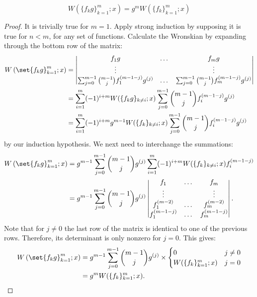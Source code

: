 \documentclass{article}
\begin{document}
\begin{lemma}
\begin{equation*}
W(\{ f_k g \}_{k=1}^m ; x) = g^m W(\{ f_k \}_{k=1}^m ; x )
\end{equation*}
\label{lem:group}
\end{lemma}

\begin{proof}
It is trivially true for $m=1$.
Apply strong induction by supposing it is true for $n<m$, for any set of functions.
Calculate the Wronskian by expanding through the bottom row of the matrix:
\begin{equation*}
\begin{split}
\W{\set{f_k g}_{k=1}^m}{x}
& = \begin{vmatrix}
f_1 g & \dots & f_m g \\
\vdots & & \vdots \\
\sum_{j=0}^{m-1} \binom{m-1}{j} f_1^{(m-1-j)} g^{(j)}
& \dots & \sum_{j=0}^{m-1} \binom{m-1}{j} f_m^{(m-1-j)} g^{(j)}
\end{vmatrix} \\
& = \sum_{i=1}^m (-1)^{i+m} W(\{f_k g\}_{k \neq i} ; x) \sum_{j=0}^{m-1} \binom{m-1}{j} f_i^{(m-1-j)} g^{(j)} \\
& = \sum_{i=1}^m (-1)^{i+m} g^{m-1} W(\{ f_k \}_{k \neq i} ; x) \sum_{j=0}^{m-1} \binom{m-1}{j} f_i^{(m-1-j)} g^{(j)}
\end{split}
\end{equation*}
by our induction hypothesis.
We next need to interchange the summations:
\begin{equation*}
\begin{split}
\W{\set{f_k g}_{k=1}^m}{x}
& = g^{m-1} \sum_{j=0}^{m-1} \binom{m-1}{j} g^{(j)}
\sum_{i=1}^m (-1)^{i+m} W(\{f_k\}_{k\neq i} ; x) f_i^{(m-1-j)} \\
& = g^{m-1} \sum_{j=0}^{m-1} \binom{m-1}{j} g^{(j)}
\begin{vmatrix} f_1 & \dots & f_m \\
\vdots & & \vdots \\
f_1^{(m-2)} & \dots & f_m^{(m-2)} \\
f_1^{(m-1-j)} & \dots & f_m^{(m-1-j)} \end{vmatrix} .
\end{split}
\end{equation*}
Note that for $j \neq 0$ the last row of the matrix is identical to one of the previous rows.
Therefore, its determinant is only nonzero for $j = 0$.
This gives:
\begin{equation*}
\begin{split}
\W{\set{f_k g}_{k=1}^m}{x}
& = g^{m-1} \sum_{j=0}^{m-1} \binom{m-1}{j} g^{(j)} \times \begin{cases} 0 & j\neq 0 \\
W(\{f_k\}_{k=1}^m ; x) & j = 0 \end{cases} \\
& = g^m W(\{f_k\}_{k=1}^m ; x) .
\end{split}
\end{equation*}
\end{proof}
\end{document}
